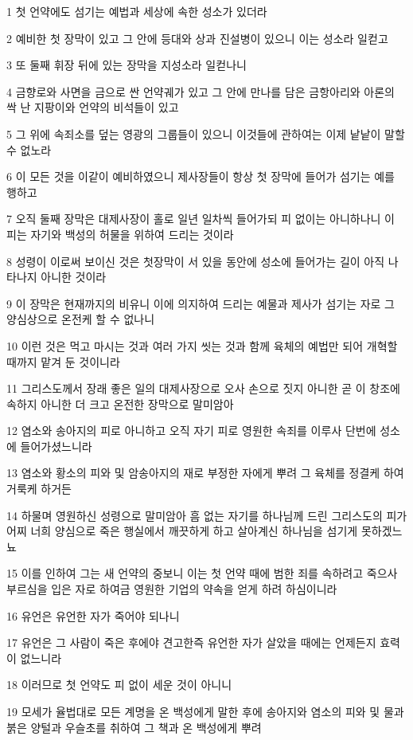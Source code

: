 \par 1 첫 언약에도 섬기는 예법과 세상에 속한 성소가 있더라
\par 2 예비한 첫 장막이 있고 그 안에 등대와 상과 진설병이 있으니 이는 성소라 일컫고
\par 3 또 둘째 휘장 뒤에 있는 장막을 지성소라 일컫나니
\par 4 금향로와 사면을 금으로 싼 언약궤가 있고 그 안에 만나를 담은 금항아리와 아론의 싹 난 지팡이와 언약의 비석들이 있고
\par 5 그 위에 속죄소를 덮는 영광의 그룹들이 있으니 이것들에 관하여는 이제 낱낱이 말할 수 없노라
\par 6 이 모든 것을 이같이 예비하였으니 제사장들이 항상 첫 장막에 들어가 섬기는 예를 행하고
\par 7 오직 둘째 장막은 대제사장이 홀로 일년 일차씩 들어가되 피 없이는 아니하나니 이 피는 자기와 백성의 허물을 위하여 드리는 것이라
\par 8 성령이 이로써 보이신 것은 첫장막이 서 있을 동안에 성소에 들어가는 길이 아직 나타나지 아니한 것이라
\par 9 이 장막은 현재까지의 비유니 이에 의지하여 드리는 예물과 제사가 섬기는 자로 그 양심상으로 온전케 할 수 없나니
\par 10 이런 것은 먹고 마시는 것과 여러 가지 씻는 것과 함께 육체의 예법만 되어 개혁할 때까지 맡겨 둔 것이니라
\par 11 그리스도께서 장래 좋은 일의 대제사장으로 오사 손으로 짓지 아니한 곧 이 창조에 속하지 아니한 더 크고 온전한 장막으로 말미암아
\par 12 염소와 송아지의 피로 아니하고 오직 자기 피로 영원한 속죄를 이루사 단번에 성소에 들어가셨느니라
\par 13 염소와 황소의 피와 및 암송아지의 재로 부정한 자에게 뿌려 그 육체를 정결케 하여 거룩케 하거든
\par 14 하물며 영원하신 성령으로 말미암아 흠 없는 자기를 하나님께 드린 그리스도의 피가 어찌 너희 양심으로 죽은 행실에서 깨끗하게 하고 살아계신 하나님을 섬기게 못하겠느뇨
\par 15 이를 인하여 그는 새 언약의 중보니 이는 첫 언약 때에 범한 죄를 속하려고 죽으사 부르심을 입은 자로 하여금 영원한 기업의 약속을 얻게 하려 하심이니라
\par 16 유언은 유언한 자가 죽어야 되나니
\par 17 유언은 그 사람이 죽은 후에야 견고한즉 유언한 자가 살았을 때에는 언제든지 효력이 없느니라
\par 18 이러므로 첫 언약도 피 없이 세운 것이 아니니
\par 19 모세가 율법대로 모든 계명을 온 백성에게 말한 후에 송아지와 염소의 피와 및 물과 붉은 양털과 우슬초를 취하여 그 책과 온 백성에게 뿌려
